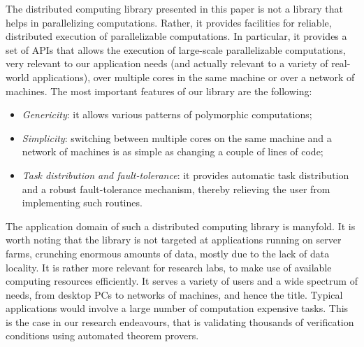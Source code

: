 \documentclass[tfpsymp,pagenumbers]{tfp07symp}
\begin{document}
The distributed computing library presented in this paper is not a
library that helps in parallelizing computations. Rather, it provides
facilities for reliable, distributed execution of parallelizable
computations. In particular, it provides a set of APIs that allows the
execution of large-scale parallelizable computations, very relevant to
our application needs (and actually relevant to a variety of
real-world applications), over multiple cores in the same machine or
over a network of machines. 
The most important features of our library are the following:
\begin{itemize}
\item \emph{Genericity}: 
  it allows various patterns of polymorphic computations;
\item \emph{Simplicity}: switching between multiple cores on the same
  machine and a network of machines is as simple as changing a couple
  of lines of code;
\item \emph{Task distribution and fault-tolerance}: 
  it provides automatic task distribution and
  a robust fault-tolerance mechanism, thereby
  relieving the user from implementing such routines.
\end{itemize}
The application domain of such a distributed computing library is manyfold. 
It is worth noting that the library is not targeted at applications
running on server farms, crunching enormous amounts of data, mostly
due to the lack of data locality. 
It is rather more relevant for research labs, to make use of available
computing resources efficiently. It serves a variety of users and a wide
spectrum of needs, from desktop PCs to networks of machines, and hence
the title.
Typical applications would involve a large number
of computation expensive tasks.
This is the case in our
research endeavours, that is validating thousands of verification
conditions using automated theorem provers. 
\end{document}
